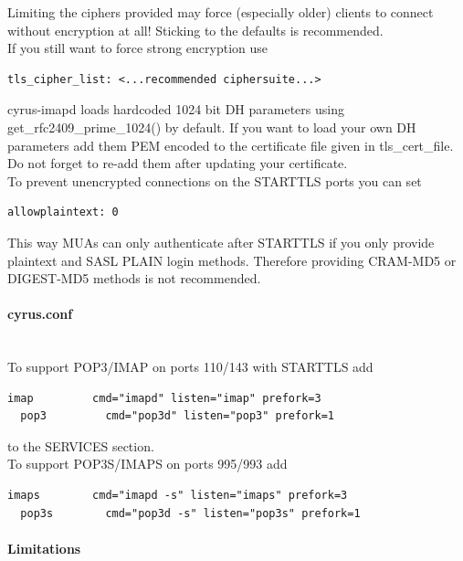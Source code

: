 Limiting the ciphers provided may force (especially older) clients to connect without encryption at all! Sticking to the defaults is recommended.\\

If you still want to force strong encryption use
\begin{lstlisting}[breaklines]
  tls_cipher_list: <...recommended ciphersuite...>
\end{lstlisting}

cyrus-imapd loads hardcoded 1024 bit DH parameters using get\_rfc2409\_prime\_1024() by default. If you want to load your own DH parameters add them PEM encoded to the certificate file given in tls\_cert\_file. Do not forget to re-add them after updating your certificate.\\

To prevent unencrypted connections on the STARTTLS ports you can set
\begin{lstlisting}[breaklines]
  allowplaintext: 0
\end{lstlisting}
This way MUAs can only authenticate after STARTTLS if you only provide plaintext and SASL PLAIN login methods. Therefore providing CRAM-MD5 or DIGEST-MD5 methods is not recommended.\\

\paragraph*{cyrus.conf}\mbox{}\\

To support POP3/IMAP on ports 110/143 with STARTTLS add
\begin{lstlisting}[breaklines]
  imap         cmd="imapd" listen="imap" prefork=3
  pop3         cmd="pop3d" listen="pop3" prefork=1
\end{lstlisting}
to the SERVICES section.\\

To support POP3S/IMAPS on ports 995/993 add
\begin{lstlisting}[breaklines]
  imaps        cmd="imapd -s" listen="imaps" prefork=3
  pop3s        cmd="pop3d -s" listen="pop3s" prefork=1
\end{lstlisting}


\paragraph*{Limitations}\mbox{}\\

